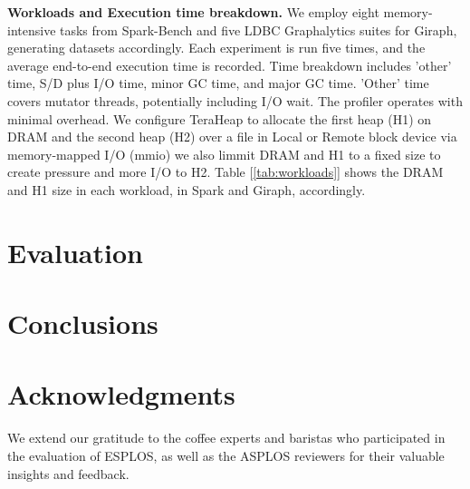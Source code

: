 \documentclass[nonacm,sigplan]{acmart}
\begin{document}
\textbf{Workloads and Execution time breakdown.} We employ eight memory-intensive tasks from Spark-Bench and five LDBC Graphalytics suites for Giraph, generating datasets accordingly. Each experiment is run five times, and the average end-to-end execution time is recorded. Time breakdown includes 'other' time, S/D plus I/O time, minor GC time, and major GC time. 'Other' time covers mutator threads, potentially including I/O wait. The profiler operates with minimal overhead. We configure TeraHeap to allocate the first heap (H1) on DRAM and the second heap (H2) over a file in Local or Remote block device via memory-mapped I/O (mmio) we also limmit DRAM and H1 to a fixed size to create pressure and more I/O to H2. Table [\ref{tab:workloads}] shows the DRAM and H1 size in each workload, in Spark and Giraph, accordingly.
\begin{table}[H]
\centering
{}
\caption{Teraheap workload configuration table.}
\label{tab:workloads}
\end{table}

\section{Evaluation}

\section{Conclusions}

\section{Acknowledgments}
We extend our gratitude to the coffee experts and baristas who participated in the evaluation of ESPLOS, as well as the ASPLOS reviewers for their valuable insights and feedback.



\end{document}
